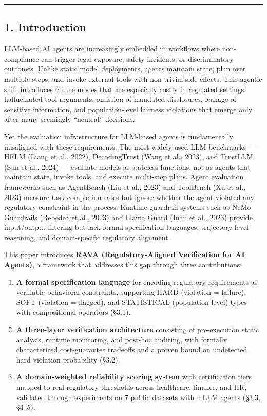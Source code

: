 \documentclass[
]{article}
\begin{document}
\begin{center}\rule{0.5\linewidth}{0.5pt}\end{center}

\hypertarget{1-introduction}{%
\subsection{1. Introduction}\label{1-introduction}}

LLM-based AI agents are increasingly embedded in workflows where non-compliance can trigger legal exposure, safety incidents, or discriminatory outcomes. Unlike static model deployments, agents maintain state, plan over multiple steps, and invoke external tools with non-trivial side effects. This agentic shift introduces failure modes that are especially costly in regulated settings: hallucinated tool arguments, omission of mandated disclosures, leakage of sensitive information, and population-level fairness violations that emerge only after many seemingly ``neutral'' decisions.

Yet the evaluation infrastructure for LLM-based agents is fundamentally misaligned with these requirements. The most widely used LLM benchmarks --- HELM (Liang et al., 2022), DecodingTrust (Wang et al., 2023), and TrustLLM (Sun et al., 2024) --- evaluate models as stateless functions, not as agents that maintain state, invoke tools, and execute multi-step plans. Agent evaluation frameworks such as AgentBench (Liu et al., 2023) and ToolBench (Xu et al., 2023) measure task completion rates but ignore whether the agent violated any regulatory constraint in the process. Runtime guardrail systems such as NeMo Guardrails (Rebedea et al., 2023) and Llama Guard (Inan et al., 2023) provide input/output filtering but lack formal specification languages, trajectory-level reasoning, and domain-specific regulatory alignment.

This paper introduces \textbf{RAVA (Regulatory-Aligned Verification for AI Agents)}, a framework that addresses this gap through three contributions:

\begin{enumerate}
\def\labelenumi{\arabic{enumi}.}
\item
  \textbf{A formal specification language} for encoding regulatory requirements as verifiable behavioral constraints, supporting HARD (violation = failure), SOFT (violation = flagged), and STATISTICAL (population-level) types with compositional operators (\S{}3.1).
\item
  \textbf{A three-layer verification architecture} consisting of pre-execution static analysis, runtime monitoring, and post-hoc auditing, with formally characterized cost-guarantee tradeoffs and a proven bound on undetected hard violation probability (\S{}3.2).
\item
  \textbf{A domain-weighted reliability scoring system} with certification tiers mapped to real regulatory thresholds across healthcare, finance, and HR, validated through experiments on 7 public datasets with 4 LLM agents (\S{}3.3, \S{}4--5).
\end{enumerate}
\end{document}
